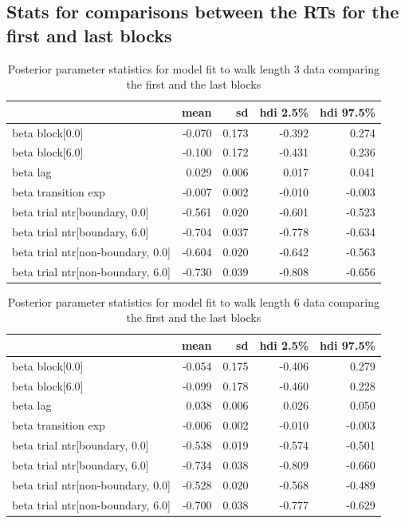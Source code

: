 \subsection*{Stats for comparisons between the RTs for the first and last blocks}

\begin{table}[H]
    \centering
    \begin{tabular}{lrrrr}
        \toprule
         & mean & sd & hdi 2.5\% & hdi 97.5\% \\
        \midrule
        beta block[0.0] & -0.070 & 0.173 & -0.392 & 0.274 \\
        beta block[6.0] & -0.100 & 0.172 & -0.431 & 0.236 \\
        beta lag & 0.029 & 0.006 & 0.017 & 0.041 \\
        beta transition exp & -0.007 & 0.002 & -0.010 & -0.003 \\
        beta trial ntr[boundary, 0.0] & -0.561 & 0.020 & -0.601 & -0.523 \\
        beta trial ntr[boundary, 6.0] & -0.704 & 0.037 & -0.778 & -0.634 \\
        beta trial ntr[non-boundary, 0.0] & -0.604 & 0.020 & -0.642 & -0.563 \\
        beta trial ntr[non-boundary, 6.0] & -0.730 & 0.039 & -0.808 & -0.656 \\
        \bottomrule
    \end{tabular}        
    \caption{Posterior parameter statistics for model fit to walk length 3 data comparing the first and the last blocks}
    \label{tab:first-last-blocks-3}    
\end{table}

\begin{table}[H]
    \centering
    \begin{tabular}{lrrrr}
        \toprule
         & mean & sd & hdi 2.5\% & hdi 97.5\% \\
        \midrule
        beta block[0.0] & -0.054 & 0.175 & -0.406 & 0.279 \\
        beta block[6.0] & -0.099 & 0.178 & -0.460 & 0.228 \\
        beta lag & 0.038 & 0.006 & 0.026 & 0.050 \\
        beta transition exp & -0.006 & 0.002 & -0.010 & -0.003 \\
        beta trial ntr[boundary, 0.0] & -0.538 & 0.019 & -0.574 & -0.501 \\
        beta trial ntr[boundary, 6.0] & -0.734 & 0.038 & -0.809 & -0.660 \\
        beta trial ntr[non-boundary, 0.0] & -0.528 & 0.020 & -0.568 & -0.489 \\
        beta trial ntr[non-boundary, 6.0] & -0.700 & 0.038 & -0.777 & -0.629 \\
        \bottomrule
    \end{tabular}
    \caption{Posterior parameter statistics for model fit to walk length 6 data comparing the first and the last blocks}
    \label{tab:first-last-blocks-6}    
    
\end{table}

